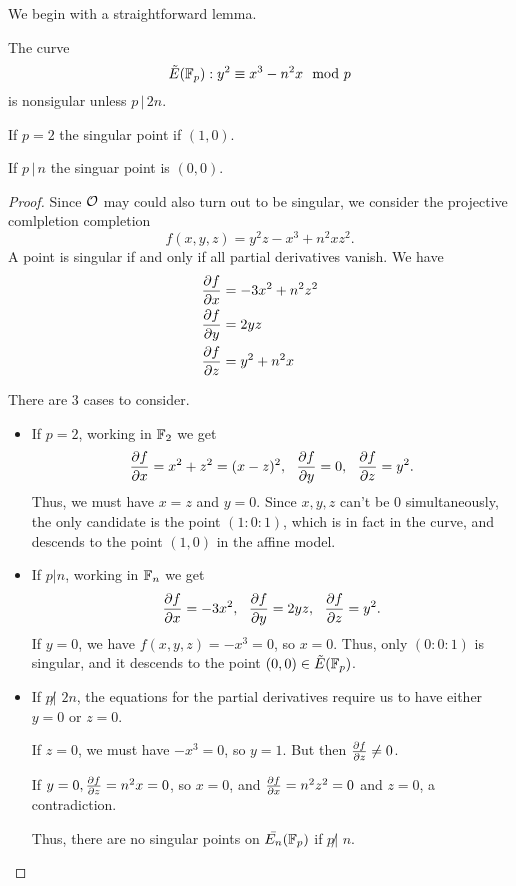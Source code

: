 \documentclass[12pt, a4paper]{amsart}
\begin{document}
We begin with a straightforward lemma.

\begin{lemma} \label{singularity_condition}
  The curve
  \[ {\tilde{E}(\mathbb{F}_p)} : y^2 \equiv x^3 - n^2x \mod{p}\]
  is nonsigular unless $p \, | \, 2n$.

  If $p = 2$ the singular point if $(1,0)$.

  If $p \, | \, n$ the singuar point is $(0,0)$.

\end{lemma}

\begin{proof}
  Since ${\mathcal O}$ may could also turn out to be singular, we consider
  the projective comlpletion completion
  \[f(x,y,z) = y^2z - x^3 + n^2 xz^2.\]
  A point is singular if and only if all partial derivatives vanish.
  We have
  \begin{equation*}
    \begin{split}
      \frac{\partial f}{\partial x} &= -3x^2 + n^2z^2 \\
      \frac{\partial f}{\partial y} &= 2yz \\
      \frac{\partial f}{\partial z} &= y^2 + n^2x
    \end{split}
  \end{equation*}
 
  There are 3 cases to consider.
  
  \begin{itemize}
  \item If $p = 2$, working in $\mathbb{F}_2$ we get
    \[\frac{\partial f}{\partial x} = x^2+z^2 = (x-z)^2, \,\,\,\,
      \frac{\partial f}{\partial y} = 0, \,\,\,\,
      \frac{\partial f}{\partial z} = y^2.\]
    Thus, we must have $x = z$ and $ y = 0$. Since $x, y, z$ can't be 0
    simultaneously, the only candidate is the point $(1:0:1)$, which
    is in fact in the curve, and descends to the point $(1,0)$ in the
    affine model.
    
  \item If $p | n$, working in $\mathbb{F}_n$ we get
    \[  \frac{\partial f}{\partial x} = -3x^2, \,\,\,\,
        \frac{\partial f}{\partial y} = 2yz, \,\,\,\,
        \frac{\partial f}{\partial z} = y^2.
      \]
    If $y = 0$, we have $f(x,y,z) = -x^3 = 0$, so $x = 0$.
    Thus,  only $(0:0:1)$ is singular, and it descends to the point $(0,0) \in {\tilde{E}(\mathbb{F}_p)}$.

  \item If $p \not| \,\, 2n$, the equations for the partial derivatives
    require us to have either $y = 0$ or $z = 0$.
   
    If $z = 0$, we must have $-x^3 = 0$, so $y = 1$. But then $\frac{\partial f}{\partial z}
    \neq 0$.

    If $y = 0, \frac{\partial f}{\partial z} = n^2x = 0$, so $x = 0$, and $\frac{\partial f}{\partial x} =
    n^2z^2 = 0$ and $ z = 0$, a contradiction.

    Thus, there are no singular points on $\bar{E_n}(\mathbb{F}_p)$ if $p \not|
    \,\, n$. \qedhere
  \end{itemize}
\end{proof}
\end{document}
